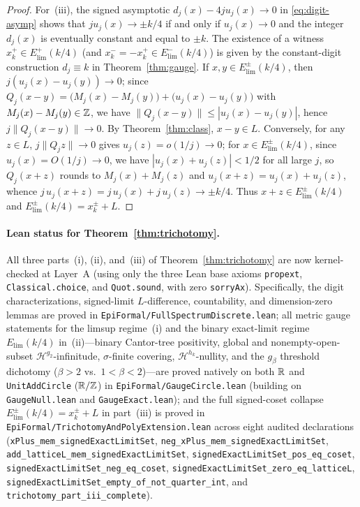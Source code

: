 \begin{proof}
For~(iii), the signed asymptotic $d_j(x)-4ju_j(x)\to0$ in
\eqref{eq:digit-asymp} shows that $ju_j(x)\to\pm k/4$ if and only if
$u_j(x)\to0$ and the integer $d_j(x)$ is eventually constant and equal to
$\pm k$. The existence of a witness $x_k^+\in E_{\mathrm{lim}}^+(k/4)$ (and
$x_k^-=-x_k^+\in E_{\mathrm{lim}}^-(k/4)$) is given by the constant-digit
construction $d_j\equiv k$ in Theorem~\ref{thm:gauge}. If
$x,y\in E_{\mathrm{lim}}^\pm(k/4)$, then $j(u_j(x)-u_j(y))\to0$; since
$Q_j(x-y)=\bigl(M_j(x)-M_j(y)\bigr)+\bigl(u_j(x)-u_j(y)\bigr)$ with
$M_j(x)-M_j(y)\in\mathbb{Z}$, we have $\|Q_j(x-y)\|\le|u_j(x)-u_j(y)|$, hence
$j\|Q_j(x-y)\|\to0$. By Theorem~\ref{thm:class}, $x-y\in L$. Conversely, for
any $z\in L$, $j\|Q_jz\|\to0$ gives $u_j(z)=o(1/j)\to0$; for
$x\in E_{\mathrm{lim}}^\pm(k/4)$, since $u_j(x)=O(1/j)\to0$, we have
$|u_j(x)+u_j(z)|<1/2$ for all large $j$, so $Q_j(x+z)$ rounds to
$M_j(x)+M_j(z)$ and $u_j(x+z)=u_j(x)+u_j(z)$, whence
$j\,u_j(x+z)=j\,u_j(x)+j\,u_j(z)\to\pm k/4$. Thus $x+z\in E_{\mathrm{lim}}^\pm(k/4)$
and $E_{\mathrm{lim}}^\pm(k/4)=x_k^\pm+L$.
\end{proof}

\paragraph{Lean status for Theorem~\ref{thm:trichotomy}.}
All three parts~(i), (ii), and~(iii) of Theorem~\ref{thm:trichotomy} are now
kernel-checked at Layer~A (using only the three Lean base axioms
\texttt{propext}, \texttt{Classical.choice}, and \texttt{Quot.sound}, with zero
\texttt{sorryAx}). Specifically, the digit characterizations, signed-limit
$L$-difference, countability, and dimension-zero lemmas are proved in
\texttt{EpiFormal/\allowbreak Full\allowbreak Spectrum\allowbreak Discrete.lean};
all metric gauge statements for the limsup regime~(i) and the binary exact-limit
regime $E_{\mathrm{lim}}(k/4)$ in~(ii)---binary Cantor-tree positivity, global
and nonempty-open-subset $\mathcal H^{g_2}$-infinitude, $\sigma$-finite
covering, $\mathcal H^{h_k}$-nullity, and the $g_\beta$ threshold dichotomy
($\beta>2$ vs.\ $1<\beta<2$)---are proved natively on both $\mathbb{R}$ and
\texttt{UnitAddCircle} ($\mathbb{R}/\mathbb{Z}$) in
\texttt{EpiFormal/\allowbreak GaugeCircle.lean} (building on
\texttt{GaugeNull.lean} and \texttt{GaugeExact.lean}); and the full
signed-coset collapse $E_{\mathrm{lim}}^\pm(k/4)=x_k^\pm+L$ in part~(iii) is
proved in
\texttt{EpiFormal/\allowbreak TrichotomyAndPolyExtension.lean} across eight
audited declarations (\texttt{xPlus\_\allowbreak mem\_\allowbreak signedExactLimitSet},
\texttt{neg\_\allowbreak xPlus\_\allowbreak mem\_\allowbreak signedExactLimitSet},
\texttt{add\_\allowbreak latticeL\_\allowbreak mem\_\allowbreak signedExactLimitSet},
\texttt{signedExactLimitSet\_\allowbreak pos\_\allowbreak eq\_\allowbreak coset},
\texttt{signedExactLimitSet\_\allowbreak neg\_\allowbreak eq\_\allowbreak coset},
\texttt{signedExactLimitSet\_\allowbreak zero\_\allowbreak eq\_\allowbreak latticeL},
\texttt{signedExactLimitSet\_\allowbreak empty\_\allowbreak of\_\allowbreak not\_\allowbreak quarter\_\allowbreak int},
and \texttt{trichotomy\_\allowbreak part\_\allowbreak iii\_\allowbreak complete}).

